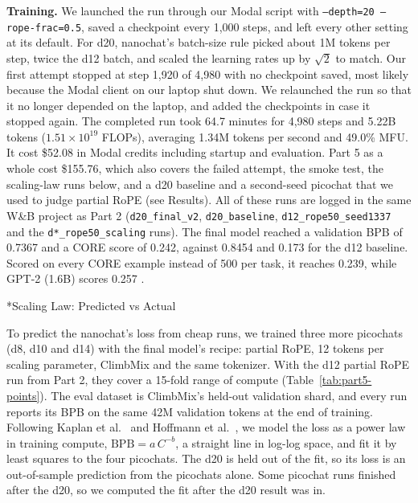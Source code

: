 \documentclass[11pt]{article}
\makeatletter
\renewcommand\subsection{\@startsection{subsection}{2}{\z@}{0.6em}{0.2em}{\normalsize\bfseries}}
\newcommand{\code}[1]{\texttt{#1}}
\makeatother
\begin{document}
\textbf{Training.} We launched the run through our Modal script with \code{--depth=20 --rope-frac=0.5}, saved a checkpoint every 1,000 steps, and left every other setting at its default. For d20, nanochat's batch-size rule picked about 1M tokens per step, twice the d12 batch, and scaled the learning rates up by $\sqrt{2}$ to match. Our first attempt stopped at step 1,920 of 4,980 with no checkpoint saved, most likely because the Modal client on our laptop shut down. We relaunched the run so that it no longer depended on the laptop, and added the checkpoints in case it stopped again. The completed run took 64.7 minutes for 4,980 steps and 5.22B tokens ($1.51 \times 10^{19}$ FLOPs), averaging 1.34M tokens per second and 49.0\% MFU. It cost \$52.08 in Modal credits including startup and evaluation. Part 5 as a whole cost \$155.76, which also covers the failed attempt, the smoke test, the scaling-law runs below, and a d20 baseline and a second-seed picochat that we used to judge partial RoPE (see Results). All of these runs are logged in the same W\&B project as Part 2 (\code{d20\_final\_v2}, \code{d20\_baseline}, \code{d12\_rope50\_seed1337} and the \code{d*\_rope50\_scaling} runs). The final model reached a validation BPB of 0.7367 and a CORE score of 0.242, against 0.8454 and 0.173 for the d12 baseline. Scored on every CORE example instead of 500 per task, it reaches 0.239, while GPT-2 (1.6B) scores 0.257 \cite{nanochat}.

\subsection*{Scaling Law: Predicted vs Actual}

To predict the nanochat's loss from cheap runs, we trained three more picochats (d8, d10 and d14) with the final model's recipe: partial RoPE, 12 tokens per scaling parameter, ClimbMix and the same tokenizer. With the d12 partial RoPE run from Part 2, they cover a 15-fold range of compute (Table~\ref{tab:part5-points}). The eval dataset is ClimbMix's held-out validation shard, and every run reports its BPB on the same 42M validation tokens at the end of training. Following Kaplan et al.\ \cite{kaplan} and Hoffmann et al.\ \cite{chinchilla}, we model the loss as a power law in training compute, $\text{BPB} = a\,C^{-b}$, a straight line in log-log space, and fit it by least squares to the four picochats. The d20 is held out of the fit, so its loss is an out-of-sample prediction from the picochats alone. Some picochat runs finished after the d20, so we computed the fit after the d20 result was in.
\end{document}
